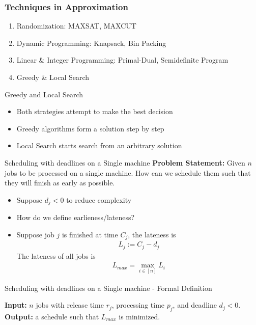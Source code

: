 \documentclass{beamer}
\newcommand*{\brk}{\\[10pt]}
\begin{document}
\begin{frame}
    \frametitle{Techniques in Approximation}
    \begin{enumerate}
        \item<1-> Randomization: MAXSAT, MAXCUT
        \item<2-> Dynamic Programming: Knapsack, Bin Packing
        \item<3-> Linear \& Integer Programming: Primal-Dual, Semidefinite Program 
        \item<4-> \color{red} Greedy \& Local Search \color{black}
    \end{enumerate}
\end{frame}

\begin{frame}{Greedy and Local Search}
    \begin{itemize}
        \item<1-> Both strategies attempt to make the best decision
        \item<2-> Greedy algorithms form a solution step by step 
        \item<3-> Local Search starts search from an arbitrary solution
    \end{itemize}
\end{frame}


\begin{frame}{Scheduling with deadlines on a Single machine}
    \textbf{Problem Statement: } Given $n$ jobs to be processed on a single machine. 
    How can we schedule them such that they will finish as early as possible. \brk 
    \begin{itemize}
        \item<1-> Suppose $d_j < 0$ to reduce complexity
        \item<2-> How do we define earlieness/lateness?
        \item<3-> Suppose job $j$ is finished at time $C_j$, the lateness is 
        \begin{align*}
            L_j := C_j - d_j 
        \end{align*}
        The lateness of all jobs is 
        \begin{align*}
            L_{max} = \max_{i \in [n]} L_i
        \end{align*} 
    \end{itemize}
\end{frame}


\begin{frame}{Scheduling with deadlines on a Single machine - Formal Definition}

\textbf{Input:} $n$ jobs with release time $r_j$, processing time $p_j$, and deadline $d_j < 0$. \brk 
\textbf{Output:} a schedule such that $L_{max}$ is minimized.
\end{frame}
\end{document}
